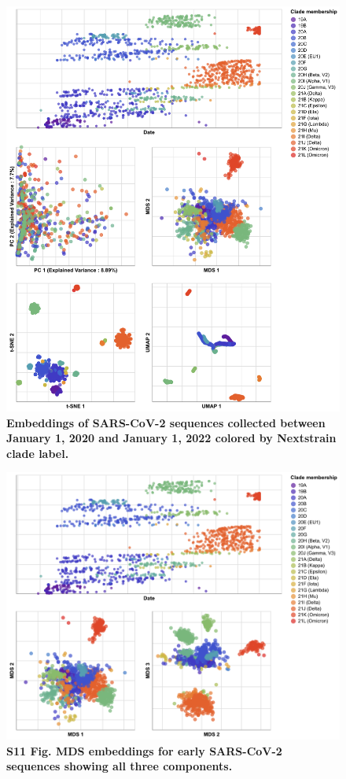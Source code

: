 \documentclass[10pt,letterpaper]{article}
\begin{document}
\begin{figure}[!h]
\includegraphics[width=\columnwidth]{figures/sarscov2-embeddings-by-Nextstrain_clade-clade.png}
\caption{{\bf Embeddings of SARS-CoV-2 sequences collected between January 1, 2020 and January 1, 2022 colored by Nextstrain clade label.}
}
\label{fig:sars-cov-2-early-embeddings-by-Nextstrain-clade}
\end{figure}

\begin{figure}[!h]
\includegraphics[width=\columnwidth]{figures/sarscov2-mds-by-Nextstrain_clade-clade.png}
\caption*{{\bf S11 Fig. MDS embeddings for early SARS-CoV-2 sequences showing all three components.}}
\end{figure}
\end{document}
